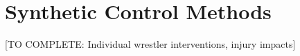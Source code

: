 \section{Synthetic Control Methods}

[TO COMPLETE: Individual wrestler interventions, injury impacts]